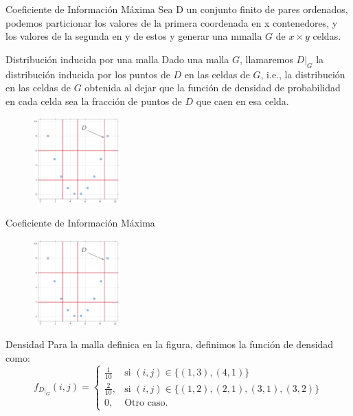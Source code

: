 \documentclass{beamer}
\begin{document}
\begin{frame}{Coeficiente de Información Máxima}
    Sea D un conjunto finito de pares ordenados, podemos particionar los valores de la primera coordenada en x contenedores, y los valores de la segunda en y de estos y generar una mmalla $G$ de $x \times y$ celdas.
    \begin{block}{Distribución inducida por una malla}
        Dado una malla $G$, llamaremos $D|_G$ la distribuci\'on inducida por los puntos de $D$ en las celdas de $G$, i.e., la distribuci\'on en las celdas de $G$ obtenida al dejar que la funci\'on de densidad de probabilidad en cada celda sea la fracci\'on de puntos de $D$ que caen en esa celda.
    \end{block}
    \begin{figure}[H]
        \centering
        \includegraphics[width=0.3\textwidth]{mallaG4x3.png}
    \end{figure}
\end{frame}

\begin{frame}{Coeficiente de Información Máxima}
    \begin{figure}[H]
        \centering
        \includegraphics[width=0.3\textwidth]{mallaG4x3.png}
    \end{figure}
    \begin{block}{Densidad}
        Para la malla definica en la figura, definimos la función de densidad como:
        \begin{equation}
            f_{D|_G}(i,j) = \left\{\begin{array}{lr}
                \frac{1}{10} & \text{si } (i,j) \in \{ (1,3), (4,1)\} \\
                \frac{2}{10}, & \text{si }(i,j) \in \{ (1,2), (2,1), (3,1),(3,2)\}  \\
                0, & \text{Otro caso.}
                \end{array}\right.
        \end{equation}
    \end{block}
\end{frame}
\end{document}
